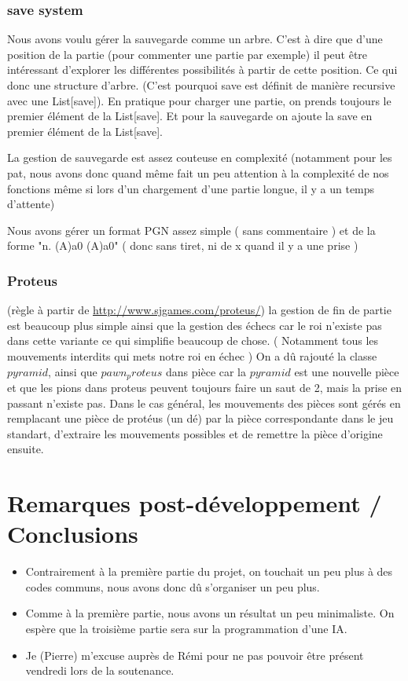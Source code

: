 \documentclass{article}
\begin{document}
\subsubsection{save system}
Nous avons voulu gérer la sauvegarde comme un arbre.
C'est à dire que d'une position de la partie (pour commenter une partie par exemple) il peut être intéressant d'explorer les différentes possibilités à partir de cette position. Ce qui donc une structure d'arbre. (C'est pourquoi save est définit de manière recursive avec une List[save]).
En pratique pour charger une partie, on prends toujours le premier élément de la List[save]. Et pour la sauvegarde on ajoute la save en premier élément de la List[save].

La gestion de sauvegarde est assez couteuse en complexité (notamment pour les pat, nous avons donc quand même fait un peu attention à la complexité de nos fonctions même si lors d'un chargement d'une partie longue, il y a un temps d'attente)

Nous avons gérer un format PGN assez simple ( sans commentaire ) et de la forme "n. (A)a0 (A)a0" ( donc sans tiret, ni de x quand il y a une prise )  

\subsubsection{Proteus}
(règle à partir de \url{http://www.sjgames.com/proteus/})
la gestion de fin de partie est beaucoup plus simple ainsi que la gestion des échecs car le roi n'existe pas dans cette variante ce qui simplifie beaucoup de chose. ( Notamment tous les mouvements interdits qui mets notre roi en échec )
On a dû rajouté la classe $pyramid$, ainsi que $pawn_proteus$ dans pièce car la $pyramid$ est une nouvelle pièce et que les pions dans proteus peuvent toujours faire un saut de 2, mais la prise en passant n'existe pas.
Dans le cas général, les mouvements des pièces sont gérés en remplacant une pièce de protéus (un dé) par la pièce correspondante dans le jeu standart, d'extraire les mouvements possibles et de remettre la pièce d'origine ensuite.

\section{Remarques post-développement / Conclusions}
\begin{itemize}
    \item Contrairement à la première partie du projet, on touchait un peu plus à des codes communs, nous avons donc dû s'organiser un peu plus.
    \item Comme à la première partie, nous avons un résultat un peu minimaliste. On espère que la troisième partie sera sur la programmation d'une IA.
    \item Je (Pierre) m'excuse auprès de Rémi pour ne pas pouvoir être présent vendredi lors de la soutenance.

\end{itemize}
\end{document}
